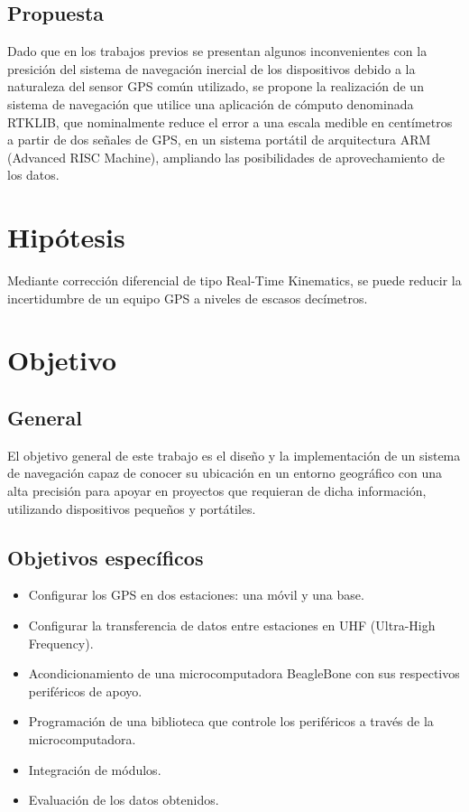 \subsection{Propuesta}
Dado que en los trabajos previos se presentan algunos inconvenientes con la presición del sistema de navegación inercial de los dispositivos debido a la naturaleza del sensor GPS común utilizado, se propone la realización de un sistema de navegación que utilice una aplicación de cómputo denominada RTKLIB, que nominalmente reduce el error a una escala medible en centímetros a partir de dos señales de GPS, en un sistema portátil de arquitectura ARM (Advanced RISC Machine), ampliando las posibilidades de aprovechamiento de los datos.

\section{Hipótesis}
Mediante corrección diferencial de tipo Real-Time Kinematics, se puede reducir la incertidumbre de un equipo GPS a niveles de escasos decímetros.

\section{Objetivo}
\subsection{General}
El objetivo general de este trabajo es el diseño y la implementación de un sistema de navegación capaz de conocer su ubicación en un entorno geográfico con una alta precisión para apoyar en proyectos que requieran de dicha información, utilizando dispositivos pequeños y portátiles.

\subsection{Objetivos específicos}
\begin{itemize}
	\item Configurar los GPS en dos estaciones: una móvil y una base.
    \item Configurar la transferencia de datos entre estaciones en UHF (Ultra-High Frequency\footnotemark).
    \item Acondicionamiento de una microcomputadora BeagleBone con sus respectivos periféricos de apoyo.
    \item Programación de una biblioteca que controle los periféricos a través de la microcomputadora.
    \item Integración de módulos.
	\item Evaluación de los datos obtenidos.   
\end{itemize}


